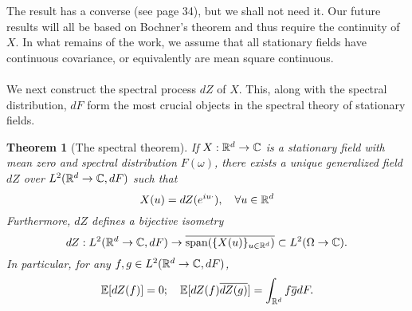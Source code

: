 \documentclass[12pt]{article}
\newtheorem{theorem}{Theorem}
\begin{document}
The result has a converse (see \cite{lindgren2012stationary} page 34), but we shall not need it. Our future results will all be based on Bochner's theorem and thus require the continuity of $X$. In what remains of the work, we assume that all stationary fields have continuous covariance, or equivalently are mean square continuous.\\
\\
We next construct the spectral process $dZ$ of $X$. This, along with the spectral distribution, $dF$ form the most crucial objects in the spectral theory of stationary fields.
\begin{theorem}[The spectral theorem]\label{spectral theorem}
	If $X:{\mathbb R}^d\to\mathbb{C}$ is a stationary field with mean zero and spectral distribution $F(\omega)$, there exists a unique generalized field $dZ$ over $L^2({\mathbb R}^d\to\mathbb{C},dF)$ such that
	\begin{equation}\label{spectral representation}
		X(u)=dZ(e^{iu\cdot}),\quad\forall u\in{\mathbb R}^d
	\end{equation}
	Furthermore, $dZ$ defines a bijective isometry
	\begin{equation*}
		dZ:L^2({\mathbb R}^d\to\mathbb{C},dF)\to\overline{\text{span}(\{X(u)\}_{u\in{\mathbb R}^d})}\subset L^2(\Omega\to\mathbb{C}).
	\end{equation*}
	In particular, for any $f,g\in L^2({\mathbb R}^d\to\mathbb{C},dF)$,
	\begin{equation}\label{dZ properties}
		\mathbb{E}[dZ(f)]=0;\quad \mathbb{E}[dZ(f)\overline{dZ(g)}]=\int_{{\mathbb R}^d} f\overline{g}dF.
	\end{equation}
\end{theorem}
\end{document}
